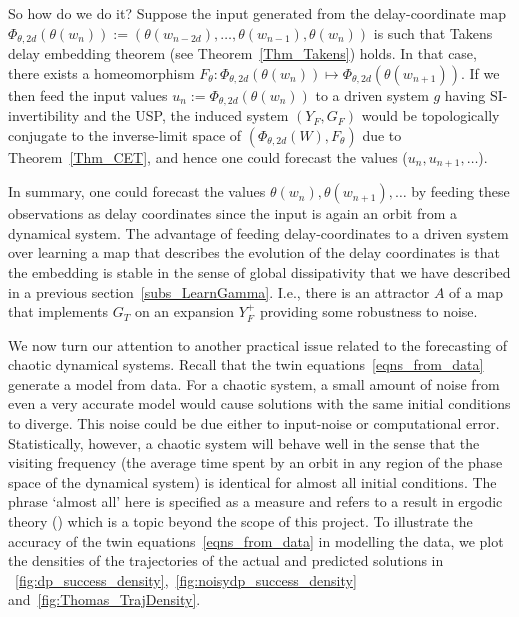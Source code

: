 So how do we do it? Suppose the input generated from the delay-coordinate map $\Phi_{\theta,2d}(\theta(w_{n})) := (\theta(w_{n-2d}),\ldots,\theta(w_{n-1}),\theta(w_{n}))$ is such that Takens delay embedding theorem (see Theorem~\ref{Thm_Takens}) holds.
In that case, there exists a homeomorphism  $F_\theta: \Phi_{\theta,2d}(\theta(w_{n})) \mapsto \Phi_{\theta,2d}(\theta(w_{n+1}))$. If we then feed the input values $u_n := \Phi_{\theta,2d}(\theta(w_{n}))$ to a driven system $g$ having SI-invertibility and the USP, the induced system $(Y_F,G_F)$ would be topologically conjugate to the inverse-limit space of
$(\Phi_{\theta,2d}(W), F_\theta)$ due to Theorem~\ref{Thm_CET}, and hence one could forecast the values ($u_n,u_{n+1},\ldots$). 

In summary, one could forecast  the values $\theta(w_n), \theta(w_{n+1}),\ldots$ by feeding these observations as delay coordinates since the input is again an orbit from a dynamical system. 
The advantage of feeding delay-coordinates to a driven system over learning a map that describes the evolution of the delay coordinates is that the embedding is stable in the sense of global dissipativity that we have described in a previous section~\ref{subs_LearnGamma}.
I.e., there is an attractor $A$ of a map that implements $G_T$ on an expansion $Y_F^+$ providing some robustness to noise. 

We now turn our attention to another practical issue related to the forecasting of chaotic dynamical systems.  
Recall that the twin equations~\ref{eqns_from_data} generate a model from data. 
For a chaotic system, a small amount of noise from even a very accurate model would cause solutions with the same initial conditions to diverge. This noise could be due either to input-noise or computational error.
Statistically, however,  a chaotic system will behave well in the sense that the visiting frequency (the average time spent by an orbit in any region of the phase space of the dynamical system) is identical for almost all initial conditions. 
The phrase `almost all' here is specified as a measure and refers to a result in ergodic theory (\cite{wikiErgodicTheory}) which is a topic beyond the scope of this project.
To illustrate the accuracy of the twin  equations~\ref{eqns_from_data} in modelling the data, we plot the densities of the trajectories of the actual and predicted solutions in ~\ref{fig:dp_success_density},~\ref{fig:noisydp_success_density} and~\ref{fig:Thomas_TrajDensity}.

